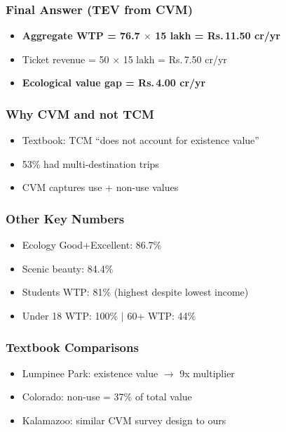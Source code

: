 \documentclass[11pt, a4paper]{article}
\newcommand{\rupee}{Rs.\,}
\begin{document}
\hfill
\begin{minipage}[t]{0.48\textwidth}
\subsubsection*{\color{navy}Final Answer (TEV from CVM)}
\begin{itemize}[nosep, leftmargin=*]
\item[] \textbf{Aggregate WTP = 76.7 $\times$ 15 lakh = \rupee 11.50 cr/yr}
\item[] Ticket revenue = 50 $\times$ 15 lakh = \rupee 7.50 cr/yr
\item[] \textbf{Ecological value gap = \rupee 4.00 cr/yr}
\end{itemize}

\subsubsection*{\color{navy}Why CVM and not TCM}
\begin{itemize}[nosep, leftmargin=*]
\item Textbook: TCM ``does not account for existence value''
\item 53\% had multi-destination trips
\item CVM captures use + non-use values
\end{itemize}

\subsubsection*{\color{navy}Other Key Numbers}
\begin{itemize}[nosep, leftmargin=*]
\item Ecology Good+Excellent: 86.7\%
\item Scenic beauty: 84.4\%
\item Students WTP: 81\% (highest despite lowest income)
\item Under 18 WTP: 100\% $|$ 60+ WTP: 44\%
\end{itemize}

\subsubsection*{\color{navy}Textbook Comparisons}
\begin{itemize}[nosep, leftmargin=*]
\item Lumpinee Park: existence value $\rightarrow$ 9x multiplier
\item Colorado: non-use = 37\% of total value
\item Kalamazoo: similar CVM survey design to ours
\end{itemize}


\end{minipage}
\end{document}
